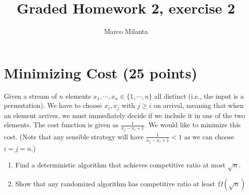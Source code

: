 \documentclass[11pt]{article}
\begin{document}
\author{Marco Milanta}
\title{Graded Homework 2, exercise 2}
\maketitle


\section*{Minimizing Cost (25 points)}
Given a stream of $n$ elements $x_1, \cdots, x_n \in \{1,\cdots,n\}$ all distinct (i.e., the input is a permutation). We have to choose $x_i, x_j$ with $j\geq i$ on arrival, meaning that when an element arrives, we must immediately decide if we include it in one of the two elements. The cost function is given as $\frac{1}{x_j-x_i+1}$. We would like to minimize this cost. (Note that any sensible strategy will have $\frac{1}{x_j-x_i+1} < 1$ as we can choose $i=j=n$.)
\begin{enumerate}
    \item Find a deterministic algorithm that achieves competitive ratio at most $\sqrt{n}$.
    \item Show that any randomized algorithm has competitive ratio at least $\Omega(\sqrt{n})$
\end{enumerate}
\end{document}
